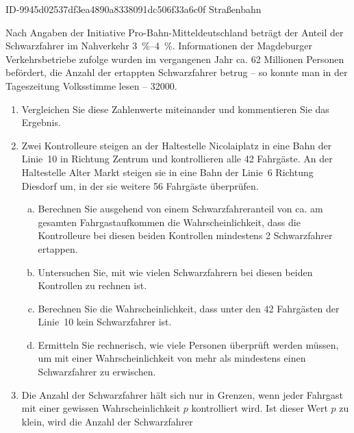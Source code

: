 \begin{exercise}
      {ID-9945d02537df3ea4890a8338091dc506f33a6c0f}
      {Straßenbahn}
  \ifproblem\problem\par
    Nach Angaben der Initiative \glqq Pro-Bahn-Mitteldeutsch\-land\grqq{} beträgt
    der Anteil der Schwarzfahrer im Nahverkehr \SIrange{3}{4}{\percent}.
    Informationen der Magdeburger Verkehrsbetriebe zufolge wurden im
    vergangenen Jahr ca. 62 Millionen Personen befördert, die Anzahl der
    ertappten Schwarzfahrer betrug -- so konnte man in der Tageszeitung
    \glqq Volksstimme\grqq{} lesen -- \num{32000}.
    \begin{enumerate}[1)]
      \item Vergleichen Sie diese Zahlenwerte miteinander und
            kommentieren Sie das Ergebnis.
      \item Zwei Kontrolleure steigen an der Haltestelle \glqq Nicolaiplatz\grqq{}
            in eine Bahn der Linie~10 in Richtung Zentrum und kontrollieren
            alle 42 Fahrgäste. An der Haltestelle \glqq Alter Markt\grqq{} steigen
            sie in eine Bahn der Linie~6 Richtung Diesdorf um, in der sie weitere
            56 Fahrgäste überprüfen.
            \begin{enumerate}[a)]
              \item Berechnen Sie ausgehend von einem Schwarzfahreranteil von ca.
                     am gesamten Fahrgastaufkommen die Wahrscheinlichkeit,
                    dass die Kontrolleure bei diesen beiden Kontrollen mindestens
                    2 Schwarzfahrer ertappen.
              \item Untersuchen Sie, mit wie vielen Schwarzfahrern bei diesen
                    beiden Kontrollen zu rechnen ist.
              \item Berechnen Sie die Wahrscheinlichkeit, dass unter den 42
                    Fahrgästen der Linie~10 kein Schwarzfahrer ist.
              \item Ermitteln Sie rechnerisch, wie viele Personen überprüft
                    werden müssen, um mit einer Wahrscheinlichkeit von mehr als
                     mindestens einen Schwarzfahrer zu erwischen.
            \end{enumerate}
      \item Die Anzahl der Schwarzfahrer hält sich nur in Grenzen, wenn jeder
            Fahrgast mit einer gewissen Wahrscheinlichkeit $p$ kontrolliert wird.
            Ist dieser Wert $p$ zu klein, wird die Anzahl der Schwarzfahrer

\end{enumerate}
\end{exercise}

